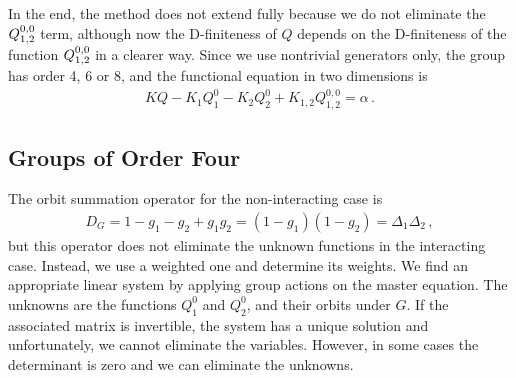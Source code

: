 In the end, the method does not extend fully because we do not eliminate the $Q_{1,2}^{0,0}$ term, although now the D-finiteness of  $Q$ depends on the D-finiteness of the function $Q_{1,2}^{0,0}$ in a clearer way. Since we use nontrivial generators only, the group has order 4, 6 or 8, and the functional equation in two dimensions is
\begin{align}
	KQ  - K_1 Q_1^0 -  K_2 Q_2^0 + K_{1,2}Q_{1,2}^{0,0} = \alpha\,.
\end{align}
\subsection{Groups of Order Four}
The orbit summation operator for the non-interacting case is
\begin{align}
	D_G = 1-g_1-g_2 + g_1g_2 = (1-g_1)(1-g_2) = \Delta_1\Delta_2\,,
\end{align}
but this operator does not eliminate the unknown functions in the interacting case. Instead, we use a weighted one and determine its weights. We find an appropriate linear system by applying group actions on the master equation. The unknowns are the functions $Q_1^0$ and $Q_2^0$, and their orbits under $G$. If the associated matrix is invertible, the system has a unique solution and unfortunately, we cannot eliminate the variables. However, in some cases the determinant is zero and we can eliminate the unknowns. 

